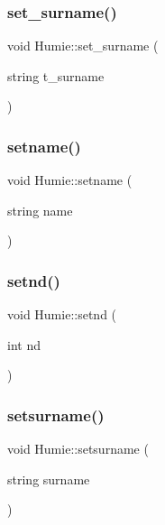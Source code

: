 \mbox{\label{class_humie_ac42c5deca59ef1519b43fa4cb203f551}} 
\subsubsection{\texorpdfstring{set\_surname()}{set\_surname()}}
{\footnotesize\ttfamily void Humie\+::set\+\_\+surname (\begin{DoxyParamCaption}\item[{string}]{t\+\_\+surname }\end{DoxyParamCaption})\hspace{0.3cm}{\ttfamily [inline]}}

\mbox{\label{class_humie_a8c31b27d12b319b0f9951c091f6aae27}} 
\subsubsection{\texorpdfstring{setname()}{setname()}}
{\footnotesize\ttfamily void Humie\+::setname (\begin{DoxyParamCaption}\item[{string}]{name }\end{DoxyParamCaption})\hspace{0.3cm}{\ttfamily [inline]}}

\mbox{\label{class_humie_a8ed046bd64955b9d6274c8116b58d887}} 
\subsubsection{\texorpdfstring{setnd()}{setnd()}}
{\footnotesize\ttfamily void Humie\+::setnd (\begin{DoxyParamCaption}\item[{int}]{nd }\end{DoxyParamCaption})\hspace{0.3cm}{\ttfamily [inline]}}

\mbox{\label{class_humie_a5889715ca02459aefb71882d2f5ca65e}} 
\subsubsection{\texorpdfstring{setsurname()}{setsurname()}}
{\footnotesize\ttfamily void Humie\+::setsurname (\begin{DoxyParamCaption}\item[{string}]{surname }\end{DoxyParamCaption})\hspace{0.3cm}{\ttfamily [inline]}}



